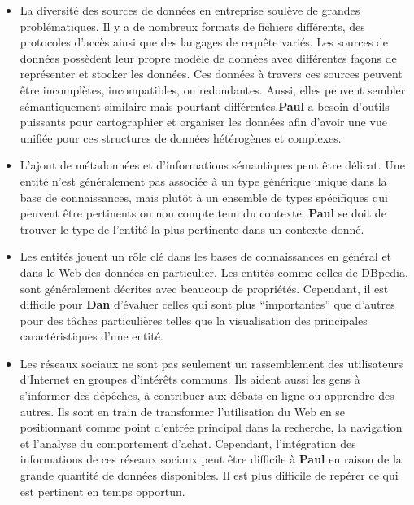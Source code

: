 \begin{itemize}
\item La diversit\'{e} des sources de donn\'{e}es en entreprise soul\`{e}ve de grandes probl\'{e}matiques. Il y a de nombreux formats de fichiers diff\'{e}rents, des protocoles d'acc\`{e}s ainsi que des langages de requ\^{e}te vari\'{e}s. Les sources de donn\'{e}es poss\`{e}dent leur propre mod\`{e}le de donn\'{e}es avec diff\'{e}rentes façons de repr\'{e}senter et stocker les donn\'{e}es. Ces donn\'{e}es \`{a} travers ces sources peuvent \^{e}tre incompl\`{e}tes, incompatibles, ou redondantes. Aussi, elles peuvent sembler s\'{e}mantiquement similaire mais pourtant diff\'{e}rentes.\textbf{Paul} a besoin d'outils puissants pour cartographier et organiser les donn\'{e}es afin d'avoir une vue unifi\'{e}e pour ces structures de donn\'{e}es h\'{e}t\'{e}rog\`{e}nes et complexes.
\item L'ajout de m\'{e}tadonn\'{e}es et d'informations s\'{e}mantiques peut \^{e}tre d\'{e}licat. Une entit\'{e} n'est g\'{e}n\'{e}ralement pas associ\'{e}e \`{a} un type g\'{e}n\'{e}rique unique dans la base de connaissances, mais plut\^{o}t \`{a} un ensemble de types sp\'{e}cifiques qui peuvent \^{e}tre pertinents ou non compte tenu du contexte. \textbf{Paul} se doit de trouver le type de l'entit\'{e} la plus pertinente dans un contexte donn\'{e}.
\item Les entit\'{e}s jouent un r\^{o}le cl\'{e} dans les bases de connaissances en g\'{e}n\'{e}ral et dans le Web des donn\'{e}es en particulier. Les entit\'{e}s comme celles de DBpedia, sont g\'{e}n\'{e}ralement d\'{e}crites avec beaucoup de propri\'{e}t\'{e}s. Cependant, il est difficile pour \textbf{Dan} d'\'{e}valuer celles qui sont plus ``importantes'' que d'autres pour des tâches particuli\`{e}res telles que la visualisation des principales caract\'{e}ristiques d'une entit\'{e}.
\item Les r\'{e}seaux sociaux ne sont pas seulement un rassemblement des utilisateurs d'Internet en groupes d'int\'{e}r\^{e}ts communs. Ils aident aussi les gens \`{a} s'informer des d\'{e}p\^{e}ches, \`{a} contribuer aux d\'{e}bats en ligne ou apprendre des autres. Ils sont en train de transformer l'utilisation du Web en se positionnant comme point d'entr\'{e}e principal dans la recherche, la navigation et l'analyse du comportement d'achat. Cependant, l'int\'{e}gration des informations de ces r\'{e}seaux sociaux peut \^{e}tre difficile \`{a} \textbf{Paul} en raison de la grande quantit\'{e} de donn\'{e}es disponibles. Il est plus difficile de rep\'{e}rer ce qui est pertinent en temps opportun.
\end{itemize}


